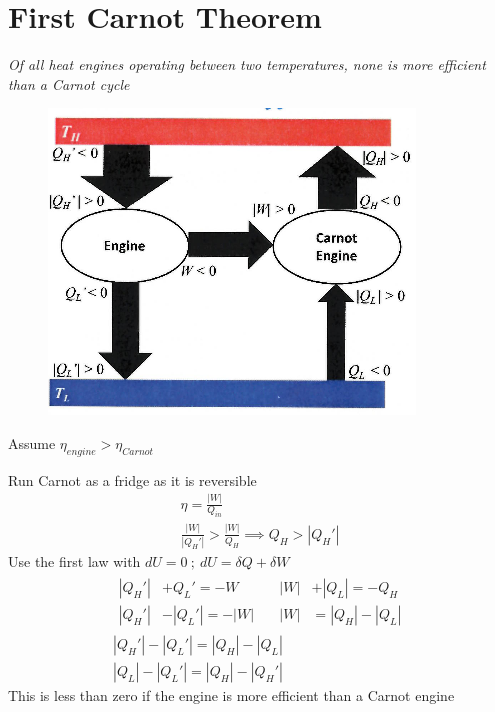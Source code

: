 \documentclass[a4paper, 11pt, normalem]{report}
\begin{document}
\section{First Carnot Theorem}
\emph{Of all heat engines operating between two temperatures, none is more efficient than a Carnot cycle}

\begin{figure}
    \begin{center}
        \includegraphics[scale=0.5]{Carnot1.png}
        \vspace{-70pt}
    \end{center}
\end{figure}

Assume $\eta_{engine} > \eta_{Carnot}$

Run Carnot as a fridge as it is reversible
\begin{gather*}
    \eta = \frac{|W|}{Q_{in}} \\
    \frac{|W|}{|Q_{H}'|} > \frac{|W|}{Q_H} \implies Q_{H} > |Q_{H}'|
\end{gather*}
Use the first law with $dU = 0 ~;~ dU = \delta Q + \delta W$
\begin{gather*}
    \begin{alignedat}{2}
        |Q_{H}'| &+ Q_{L}' = -W     &\quad |W| &+ |Q_{L}| = -Q_{H} \\
        |Q_{H}'| &- |Q_{L}'| = -|W| &\quad |W| &= |Q_H| - |Q_L|
    \end{alignedat} \\
    |Q_{H}'| - |Q_{L}'| = |Q_H| - |Q_L| \\
    |Q_L| - |Q_L'| = |Q_H| - |Q_H'|
\end{gather*}
This is less than zero if the engine is more efficient than a Carnot engine
\end{document}
